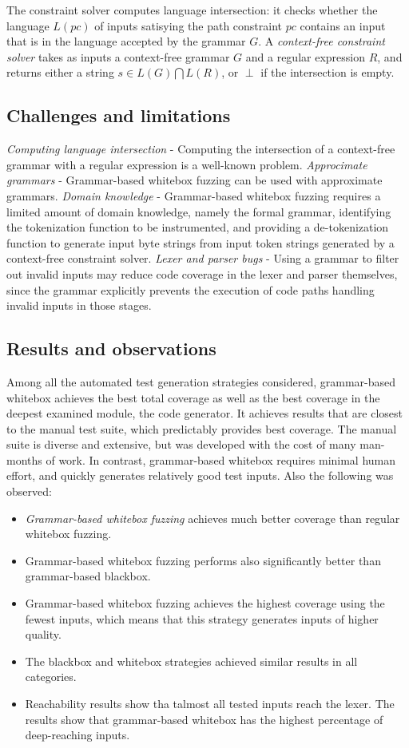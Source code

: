 The constraint solver computes language intersection: it checks whether the language $L(pc)$ of inputs satisying the path constraint $pc$ contains an input that is in the language accepted by the grammar $G$.
A \textit{context-free constraint solver} takes as inputs a context-free grammar $G$ and a regular expression $R$, and returns either a string $s \in L(G) \bigcap L(R)$, or $\perp$ if the intersection is empty.

\subsection{Challenges and limitations}
\textit{Computing language intersection} - Computing the intersection of a context-free grammar with a regular expression is a well-known problem.
\textit{Approcimate grammars} - Grammar-based whitebox fuzzing can be used with approximate grammars.
\textit{Domain knowledge} - Grammar-based whitebox fuzzing requires a limited amount of domain knowledge, namely the formal grammar, identifying the tokenization function to be instrumented, and providing a de-tokenization function to generate input byte strings from input token strings generated by a context-free constraint solver.
\textit{Lexer and parser bugs} - Using a grammar to filter out invalid inputs may reduce code coverage in the lexer and parser themselves, since the grammar explicitly prevents the execution of code paths handling invalid inputs in those stages.

\subsection{Results and observations}
Among all the automated test generation strategies considered, grammar-based whitebox achieves the best total coverage as well as the best coverage in the deepest examined module, the code generator.
It achieves results that are closest to the manual test suite, which predictably provides best coverage. The manual suite is diverse and extensive, but was developed with the cost of many man-months of work. In contrast, grammar-based whitebox requires minimal human effort, and quickly generates relatively good test inputs.
Also the following was observed:
\begin{itemize}
    \item \textit{Grammar-based whitebox fuzzing} achieves much better coverage than regular whitebox fuzzing.
    \item Grammar-based whitebox fuzzing performs also significantly better than grammar-based blackbox.
    \item Grammar-based whitebox fuzzing achieves the highest coverage using the fewest inputs, which means that this strategy generates inputs of higher quality.
    \item The blackbox and whitebox strategies achieved similar results in all categories.
    \item Reachability results show tha talmost all tested inputs reach the lexer. The results show that grammar-based whitebox has the highest percentage of deep-reaching inputs.
\end{itemize}


